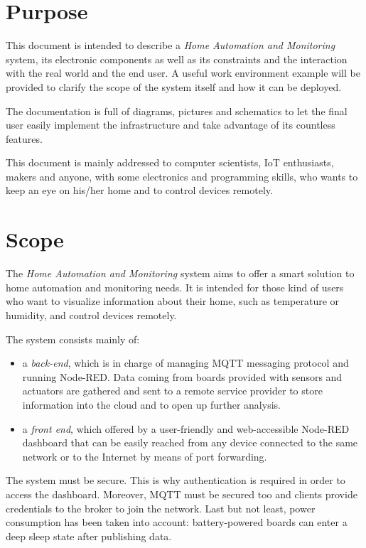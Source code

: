 \section{Purpose}
This document is intended to describe a \textit{Home Automation and Monitoring} system, its electronic components as well as its constraints and the interaction with the real world and the end user. A useful work environment example will be provided to clarify the scope of the system itself and how it can be deployed.

The documentation is full of diagrams, pictures and schematics to let the final user easily implement the infrastructure and take advantage of its countless features.

This document is mainly addressed to computer scientists, IoT enthusiasts, makers and anyone, with some electronics and programming skills, who wants to keep an eye on his/her home and to control devices remotely.

\section{Scope}
The \textit{Home Automation and Monitoring} system aims to offer a smart solution to home automation and monitoring needs. It is intended for those kind of users who want to visualize information about their home, such as temperature or humidity, and control devices remotely.

The system consists mainly of:
\begin{itemize}
	\item a \textit{back-end}, which is in charge of managing MQTT messaging protocol and running Node-RED. Data coming from boards provided with sensors and actuators are gathered and sent to a remote service provider to store information into the cloud and to open up further analysis.
	
	\item a \textit{front end}, which offered by a user-friendly and web-accessible Node-RED dashboard that can be easily reached from any device connected to the same network or to the Internet by means of port forwarding.
\end{itemize}

\noindent
The system must be secure. This is why authentication is required in order to access the dashboard.
Moreover, MQTT must be secured too and clients provide credentials to the broker to join the network.
Last but not least, power consumption has been taken into account: battery-powered boards can enter a deep sleep state after publishing data.


